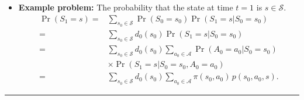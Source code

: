\documentclass{article}
\begin{document}
\begin{itemize}
        \item \textbf{Example problem:} The probability that the state at time $t = 1$ is $s \in \mathcal S$. 
        \begin{align}
        \Pr(S_1 = s) =& \sum_{s_0 \in \mathcal S} \Pr(S_0 = s_0) \Pr(S_1 = s | S_0 = s_0) \\
        =& \sum_{s_0\in \mathcal S} d_0(s_0) \Pr(S_1 = s | S_0 = s_0)\\
        =& \sum_{s_0\in \mathcal S} d_0(s_0) \sum_{a_0\in \mathcal A} \Pr(A_0 = a_0 | S_0 = s_0)\\
        &\times \Pr(S_1 = s | S_0 = s_0, A_0 = a_0)\\
        =& \sum_{s_0\in \mathcal S} d_0(s_0) \sum_{a_0\in \mathcal A} \pi(s_0, a_0) \, p(s_0, a_0, s).
        \end{align}
    \end{itemize}

\vspace{0.5cm}
\noindent\rule{\textwidth}{1pt}
\end{document}
